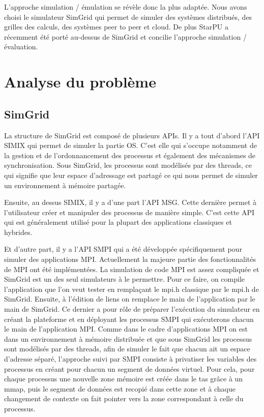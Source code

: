 \documentclass[smallextended]{svjour3}
\begin{document}
L'approche simulation / émulation se révèle donc la plus adaptée.
Nous avons choisi le simulateur SimGrid qui permet de simuler des
systèmes distribués, des grilles des calculs, des systèmes peer to
peer et cloud. De plus StarPU a récemment été porté au-dessus de
SimGrid et concilie l'approche simulation / évaluation.

\section{Analyse du problème}
\label{sec-3}
\subsection{SimGrid}
\label{sec-3-1}
La structure de SimGrid est composé de plusieurs APIs. Il y a tout
d'abord l'API SIMIX qui permet de simuler la partie OS. C'est elle
qui s'occupe notamment de la gestion et de l'ordonnancement des
processus et également des mécanismes de synchronisation. Sous
SimGrid, les processus sont modélisés par des threads, ce qui
signifie que leur espace d'adressage est partagé ce qui nous permet
de simuler un environnement à mémoire partagée. 

Ensuite, au dessus SIMIX, il y a d'une part l'API MSG. Cette dernière
permet à l'utilisateur créer et manipuler des processus de manière
simple. C'est cette API qui est généralement utilisé pour la
plupart des applications classiques et hybrides. 

Et d'autre part, il y a l'API SMPI qui a été développée
spécifiquement pour simuler des applications MPI. Actuellement la
majeure partie des fonctionnalités de MPI ont été implémentées. La
simulation de code MPI est assez compliquée et SimGrid est un des
seul simulateurs à le permettre. Pour ce faire, on compile
l'application que l'on veut tester en remplaçant le mpi.h classique
par le mpi.h de SimGrid. Ensuite, à l'édition de liens on remplace
le main de l'application par le main de SimGrid. Ce dernier a pour
rôle de préparer l'exécution du simulateur en créant la plateforme
et en déployant les processus SMPI qui exécuterons chacun le main
de l'application MPI. Comme dans le cadre d'applications MPI on est
dans un environnement à mémoire distribuée et que sous SimGrid les
processus sont modélisés par des threads, afin de simuler le fait
que chacun ait un espace d'adresse séparé, l'approche suivi par SMPI
consiste à privatiser les variables des processus en créant pour
chacun un segment de données virtuel. Pour cela, pour chaque processus
une nouvelle zone mémoire est créée dans le tas grâce à un mmap, puis le
segment de données est recopié dans cette zone et à chaque
changement de contexte on fait pointer vers la zone correspondant à
celle du processus. 
\end{document}
